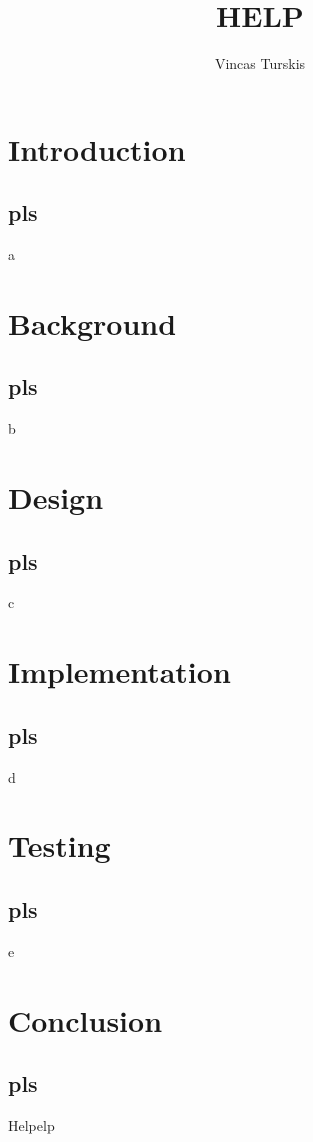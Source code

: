 \documentclass[11pt,a4paper]{report}
\author{Vincas Turskis}
\title{HELP}
\begin{document}
\tableofcontents
\chapter{Introduction}
\section{pls}
a
\chapter{Background}
\section{pls}
b
\chapter{Design}
\section{pls}
c
\chapter{Implementation}
\section{pls}
d
\chapter{Testing}
\section{pls}
e
\chapter{Conclusion}
\section{pls}
Helpelp
\end{document}
